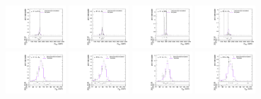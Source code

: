 \begin{figure}[htpb]
  \includegraphics[width=0.2\textwidth]{fig/2Dfit/templateVsReco_WprToWZ2000_r0_MVV_mu_HP_vbf_LDy_linear.pdf}
  \includegraphics[width=0.2\textwidth]{fig/2Dfit/templateVsReco_WprToWZ2000_r0_MVV_mu_LP_vbf_LDy_linear.pdf}
  \includegraphics[width=0.2\textwidth]{fig/2Dfit/templateVsReco_WprToWZ2000_r0_MVV_mu_HP_vbf_HDy_linear.pdf}
  \includegraphics[width=0.2\textwidth]{fig/2Dfit/templateVsReco_WprToWZ2000_r0_MVV_mu_LP_vbf_HDy_linear.pdf}\\
  \includegraphics[width=0.2\textwidth]{fig/2Dfit/templateVsReco_WprToWZ2000_r0_MJ_mu_HP_bb_LDy.pdf}
  \includegraphics[width=0.2\textwidth]{fig/2Dfit/templateVsReco_WprToWZ2000_r0_MJ_mu_LP_bb_LDy.pdf}
  \includegraphics[width=0.2\textwidth]{fig/2Dfit/templateVsReco_WprToWZ2000_r0_MJ_mu_HP_bb_HDy.pdf}
  \includegraphics[width=0.2\textwidth]{fig/2Dfit/templateVsReco_WprToWZ2000_r0_MJ_mu_LP_bb_HDy.pdf}\\

\end{figure}
